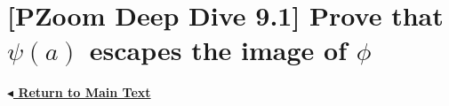 \documentclass[11pt]{article}
\begin{document}
\pagestyle{empty} %

\section*{[PZoom Deep Dive 9.1] Prove that $\psi(a)$ escapes the image of $\phi$}

\vspace{0.8cm}
\noindent
\href{\pzbaseUrl/assets/pdfs/entry-0009/entry-0009-ordinals-part-i.pdf#body:entry-0009-1}{\textbf{\ensuremath{\blacktriangleleft} Return to Main Text}}
\end{document}
